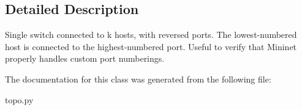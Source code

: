 \subsection{Detailed Description}
\begin{DoxyVerb}Single switch connected to k hosts, with reversed ports.
   The lowest-numbered host is connected to the highest-numbered port.
   Useful to verify that Mininet properly handles custom port
   numberings.\end{DoxyVerb}
 

The documentation for this class was generated from the following file\-:\begin{DoxyCompactItemize}
\item 
topo.\-py\end{DoxyCompactItemize}

